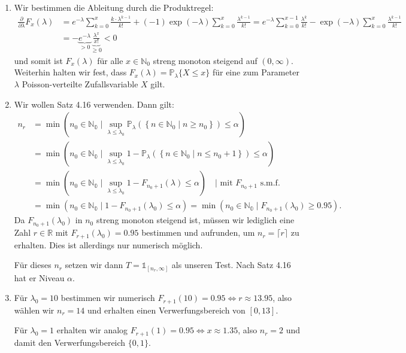 \documentclass[a4paper]{article}
\begin{document}
\begin{enumerate}
    \item Wir bestimmen die Ableitung durch die Produktregel:
    \begin{align*}
        \frac{\partial}{\partial \lambda} F_x(\lambda) &= e^{- \lambda} \sum_{k = 0}^{x} \frac{k \cdot \lambda^{k-1}}{k!} + (-1) \exp(- \lambda) \sum_{k = 0}^{x} \frac{\lambda^{k-1}}{k!} = e^{- \lambda} \sum_{k = 0}^{x-1} \frac{\lambda^{k}}{k!} - \exp(- \lambda) \sum_{k = 0}^{x} \frac{\lambda^{k-1}}{k!}\\
        &= - \underbrace{e^{-\lambda}}_{> 0} \underbrace{\frac{\lambda^{x}}{x!}}_{\geq 0} < 0
    \end{align*}
    und somit ist $F_x(\lambda)$ für alle $x \in \mathds{N}_0$ streng monoton steigend auf $(0, \infty)$.
    Weiterhin halten wir fest, dass $F_x(\lambda) = \mathds{P}_\lambda\{ X \leq x \}$ für eine zum Parameter $\lambda$ Poisson-verteilte Zufallsvariable $X$ gilt.
    \item Wir wollen Satz 4.16 verwenden. Dann gilt:
    \begin{align*}
        n_r &= \min \left( n_0 \in \mathds{N_0} \mid \sup_{\lambda \leq \lambda_0} \mathds{P}_{\lambda}(\left\{n \in \mathds{N}_0 \mid n \geq n_0 \right\} ) \leq \alpha  \right) \\
        &=\min \left( n_0 \in \mathds{N_0} \mid \sup_{\lambda \leq \lambda_0} 1 - \mathds{P}_{\lambda}(\left\{n \in \mathds{N}_0 \mid n \leq n_0+1 \right\} ) \leq \alpha  \right) \\
        &=\min \left( n_0 \in \mathds{N_0} \mid \sup_{\lambda \leq \lambda_0} 1 - F_{n_0 + 1}(\lambda) \leq \alpha  \right) \quad \text{| mit } F_{n_0 + 1} \text{ s.m.f.}\\
        &=\min \left( n_0 \in \mathds{N_0} \mid 1 - F_{n_0 + 1}(\lambda_0) \leq \alpha  \right) =\min \left( n_0 \in \mathds{N_0} \mid F_{n_0 + 1}(\lambda_0) \geq 0.95  \right)\text{.}
    \end{align*}
    Da $F_{n_0 + 1}(\lambda_0)$ in $n_0$ streng monoton steigend ist, müssen wir lediglich eine Zahl $r \in \mathds{R}$ mit $F_{r + 1}(\lambda_0) = 0.95$ bestimmen und aufrunden, um $n_r = \lceil r \rceil$ zu erhalten.
    Dies ist allerdings nur numerisch möglich. 

    Für dieses $n_r$ setzen wir dann $T = \mathds{1}_{[n_r, \infty]}$ als unseren Test.
    Nach Satz 4.16 hat er Niveau $\alpha$.
    \item Für $\lambda_0 = 10$ bestimmen wir numerisch $F_{r + 1}(10) = 0.95 \iff r \approx 13.95$, also wählen wir $n_r = 14$ und erhalten einen Verwerfungsbereich von $[0, 13]$.
    
    Für $\lambda_0 = 1$ erhalten wir analog $F_{r+1}(1) = 0.95 \iff x \approx 1.35$, also $n_r = 2$ und damit den Verwerfungsbereich $\{0,1\}$.
\end{enumerate}
\end{document}
